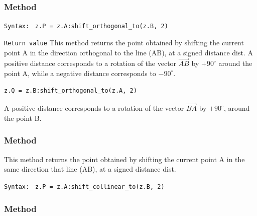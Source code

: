 \subsubsection{Method }
\label{shift_orthogonal}

\medskip
\texttt{Syntax: } \verb|z.P = z.A:shift_orthogonal_to(z.B, 2)|

\medskip
\texttt{Return value}
This method returns the point obtained by shifting the current point
A in the direction orthogonal to the line (AB), at a signed distance dist.
A positive distance corresponds to a rotation of the vector $\overrightarrow{AB}$
by $+90^\circ$ around the point A, while a negative distance corresponds to
$-90^\circ$.

\begin{verbatim}
z.Q = z.B:shift_orthogonal_to(z.A, 2)
\end{verbatim}
A positive distance corresponds to a rotation of the vector $\overrightarrow{BA}$
by $+90^\circ$, around the point B.

\begin{tkzexample}[latex=.4\textwidth]
\end{tkzexample}

\subsubsection{Method }
\label{shift_collinear}
This method returns the point obtained by shifting the current point
A in the same direction  that line (AB), at a signed distance dist.

\medskip
\texttt{Syntax: } \verb|z.P = z.A:shift_collinear_to(z.B, 2)|



\subsubsection{Method }
\label{ssub:object_rotation}


